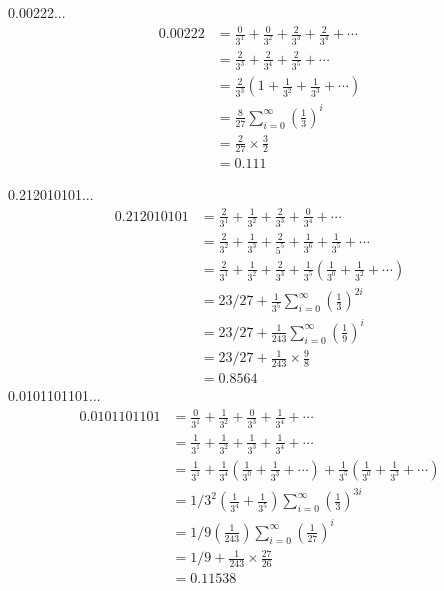 \documentclass[11pt]{report}
\theoremstyle{plain}
\theoremstyle{definition}
\begin{document}
0.00222...\\

\begin{align*}
	0.00222 &= \frac{0}{3^1}+\frac{0}{3^2}+\frac{2}{3^3}+\frac{2}{3^4}+\cdots \\
	&= \frac{2}{3^3}+\frac{2}{3^4}+\frac{2}{3^5}+\cdots\\
	&= \frac{2}{3^3} \left(1+\frac{1}{3^2}+\frac{1}{3^3}+\cdots\right)\\
	&= \frac{8}{27} \sum^\infty_{i=0} \left(\frac{1}{3}\right)^{i}\\
	&= \frac{2}{27}\times \frac{3}{2}\\
	&= 0.111
\end{align*}

0.212010101...\\
\begin{align*}
	0.212010101 &= \frac{2}{3^1}+\frac{1}{3^2}+\frac{2}{3^3}+\frac{0}{3^4}+\cdots \\
	&= \frac{2}{3^2}+\frac{1}{3^3}+\frac{2}{5^5}+\frac{1}{3^6}+\frac{1}{3^5}+\cdots\\
	&= \frac{2}{3^1}+\frac{1}{3^2}+\frac{2}{3^3}+\frac{1}{3^5}\left(\frac{1}{3^0}+\frac{1}{3^2}+\cdots \right)\\
	&=23/27 + \frac{1}{3^5} \sum^\infty_{i=0} \left(\frac{1}{3}\right)^{2i}\\
	&=23/27 + \frac{1}{243} \sum^\infty_{i=0} \left(\frac{1}{9}\right)^{i}\\
	&=23/27 + \frac{1}{243}\times\frac{9}{8}\\
	&= 0.8564
\end{align*}
0.0101101101...\\
\begin{align*}
	0.0101101101 &= \frac{0}{3^1}+\frac{1}{3^2}+\frac{0}{3^3}+\frac{1}{3^4}+\cdots \\
	&= \frac{1}{3^1}+\frac{1}{3^2}+\frac{1}{3^3}+\frac{1}{3^4}+\cdots\\
	&= \frac{1}{3^1}+\frac{1}{3^4}\left(\frac{1}{3^0}+\frac{1}{3^3}+\cdots \right) + \frac{1}{3^5}\left(\frac{1}{3^0}+\frac{1}{3^3}+\cdots \right)\\
	&= 1/3^2 \left(\frac{1}{3^4}+\frac{1}{3^5}\right) \sum^\infty_{i=0}\left(\frac{1}{3}\right)^{3i}\\
	&= 1/9 \left(\frac{1}{243}\right) \sum^\infty_{i=0}\left(\frac{1}{27}\right)^{i}\\
	&=1/9 + \frac{1}{243}\times\frac{27}{26}\\
	&= 0.11538
\end{align*}


\end{document}
